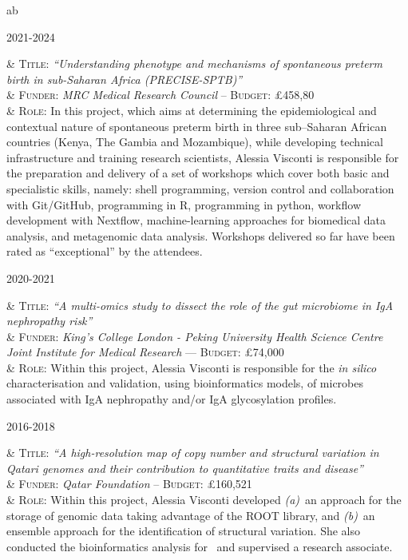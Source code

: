 \documentclass[a4paper,10pt]{article}
\newenvironment{singletablelist}
{	\vspace{-0.2cm}
	\begin{longtable}[!h]{ab}}{\end{longtable}
}
\newcommand{\stlist}[2]{
	\hspace{-3cm}
	\noindent
	\begin{minipage}{0.24\textwidth}
	\begin{flushright}
	\textsc{#1}
	\end{flushright}
	\end{minipage}
	& #2\\[0.2cm]
}
\begin{document}
\begin{singletablelist}

	\stlist{2021-2024}{ 
		  \textsc{Title:} \emph{``Understanding phenotype and mechanisms of spontaneous preterm birth in sub-Saharan Africa (PRECISE-SPTB)''}\\
		& \textsc{Funder:} \emph{MRC Medical Research Council} -- \textsc{Budget:} £458,80 \\
		& \textsc{Role:} In this project, which aims at determining the epidemiological and contextual nature of spontaneous preterm birth in three sub–Saharan African countries (Kenya, The Gambia and Mozambique), while developing technical infrastructure and training research scientists, Alessia Visconti is responsible for the preparation and delivery of a set of workshops which cover both basic and specialistic skills, namely: shell programming, version control and collaboration with Git/GitHub, programming in R, programming in python, workflow development with Nextflow, machine-learning approaches for biomedical data analysis, and metagenomic data analysis. Workshops delivered so far have been rated as “exceptional” by the attendees.
		}
		
	\stlist{2020-2021}{ 
		  \textsc{Title:} \emph{``A multi-omics study to dissect the role of the gut microbiome in IgA nephropathy risk''}\\
		& \textsc{Funder:} \emph{King's College London - Peking University Health Science Centre Joint Institute for Medical Research} --- \textsc{Budget:} £74,000 \\
		& \textsc{Role:}  Within this project, Alessia Visconti is responsible for the \emph{in silico} characterisation and validation, using bioinformatics models, of microbes associated with IgA nephropathy and/or IgA glycosylation profiles.
	}
		
	\stlist{2016-2018}{ 
		  \textsc{Title:} \emph{``A high-resolution map of copy number and structural variation in Qatari genomes and their contribution to quantitative traits and disease''}\\
		& \textsc{Funder:} \emph{Qatar Foundation} -- \textsc{Budget:} £160,521  \\
		& \textsc{Role:} Within this project, Alessia Visconti developed \emph{(a)}~an approach for the storage of genomic data taking advantage of the ROOT library, and \emph{(b)}~an ensemble approach for the identification of structural variation. She also conducted the bioinformatics analysis for~\cite{Ros21} and supervised a research associate.
	}
		
\end{singletablelist}
\end{document}
